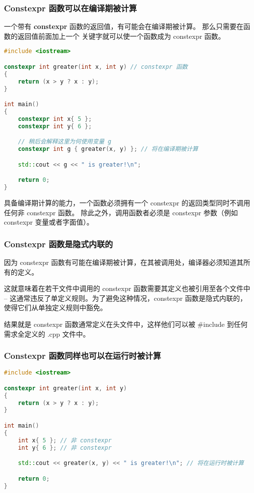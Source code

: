 \documentclass[../../LearnCpp.tex]{subfiles}
\begin{document}

\subsubsection*{Constexpr 函数可以在编译期被计算}

一个带有 \textbf{constexpr} 函数的返回值，有可能会在编译期被计算。
那么只需要在函数的返回值前面加上一个  关键字就可以使一个函数成为 constexpr 函数。

\begin{lstlisting}[language=C++]
#include <iostream>

constexpr int greater(int x, int y) // constexpr 函数
{
    return (x > y ? x : y);
}

int main()
{
    constexpr int x{ 5 };
    constexpr int y{ 6 };

    // 稍后会解释这里为何使用变量 g
    constexpr int g { greater(x, y) }; // 将在编译期被计算

    std::cout << g << " is greater!\n";

    return 0;
}
\end{lstlisting}

具备编译期计算的能力，一个函数必须拥有一个 constexpr 的返回类型同时不调用任何非 constexpr 函数。
除此之外，调用函数者必须是 constexpr 参数（例如 constexpr 变量或者字面值）。

\subsubsection*{Constexpr 函数是隐式内联的}

因为 constexpr 函数有可能在编译期被计算，在其被调用处，编译器必须知道其所有的定义。

这就意味着在若干文件中调用的 constexpr 函数需要其定义也被引用至各个文件中 -- 这通常违反了单定义规则。为了避免这种情况，constexpr 函数是隐式内联的，使得它们从单独定义规则中豁免。

结果就是 constexpr 函数通常定义在头文件中，这样他们可以被 \#include 到任何需求全定义的 .cpp 文件中。

\subsubsection*{Constexpr 函数同样也可以在运行时被计算}

\begin{lstlisting}[language=C++]
#include <iostream>

constexpr int greater(int x, int y)
{
    return (x > y ? x : y);
}

int main()
{
    int x{ 5 }; // 非 constexpr
    int y{ 6 }; // 非 constexpr

    std::cout << greater(x, y) << " is greater!\n"; // 将在运行时被计算

    return 0;
}
\end{lstlisting}
\end{document}
